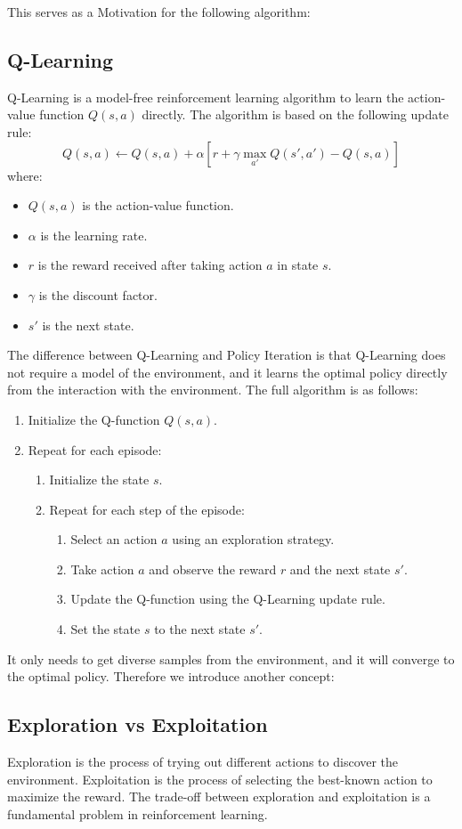 \documentclass[a4paper,12pt]{article}
\begin{document}
This serves as a Motivation for the following algorithm:
\subsection{Q-Learning}
Q-Learning is a model-free reinforcement learning algorithm to learn the action-value function $Q(s, a)$ directly. The algorithm is based on the following update rule:
\[ 
Q(s, a) \leftarrow Q(s, a) + \alpha \left[ r + \gamma \max_{a'} Q(s', a') - Q(s, a) \right]
\]
where:
\begin{itemize}
    \item $Q(s, a)$ is the action-value function.
    \item $\alpha$ is the learning rate.
    \item $r$ is the reward received after taking action $a$ in state $s$.
    \item $\gamma$ is the discount factor.
    \item $s'$ is the next state.
\end{itemize}
The difference between Q-Learning and Policy Iteration is that Q-Learning does not require a model of the environment, and it learns the optimal policy directly from the interaction with the environment.
The full algorithm is as follows:
\begin{enumerate}
    \item Initialize the Q-function $Q(s, a)$.
    \item Repeat for each episode:
    \begin{enumerate}
        \item Initialize the state $s$.
        \item Repeat for each step of the episode:
        \begin{enumerate}
            \item Select an action $a$ using an exploration strategy.
            \item Take action $a$ and observe the reward $r$ and the next state $s'$.
            \item Update the Q-function using the Q-Learning update rule.
            \item Set the state $s$ to the next state $s'$.
        \end{enumerate}
    \end{enumerate}
\end{enumerate}
It only needs to get diverse samples from the environment, and it will converge to the optimal policy.
Therefore we introduce another concept:
\subsection{Exploration vs Exploitation}
Exploration is the process of trying out different actions to discover the environment. Exploitation is the process of selecting the best-known action to maximize the reward. The trade-off between exploration and exploitation is a fundamental problem in reinforcement learning.
\end{document}
